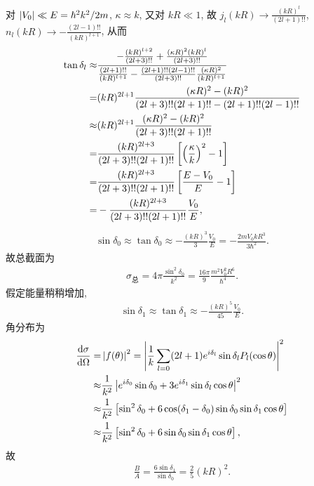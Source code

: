 \documentclass{assignment}
\begin{document}
\begin{sol}
    对 $\left\lvert V_0\right\rvert\ll E=\hbar^2k^2/2m$, $\kappa\approx k$, 又对 $kR\ll 1$, 故 $j_l(kR)\rightarrow\frac{(kR)^l}{(2l+1)!!}$, $n_l(kR)\rightarrow-\frac{(2l-1)!!}{(kR)^{l+1}}$, 从而
    \begin{align}
        \notag\tan\delta_l\approx&\frac{-\frac{(kR)^{l+2}}{(2l+3)!!}+\frac{(\kappa R)^2(kR)^l}{(2l+3)!!}}{\frac{(2l+1)!!}{(kR)^{l+1}}-\frac{(2l+1)!!(2l-1)!!}{(2l+3)!!}\frac{(\kappa R)^2}{(kR)^{l+1}}}\\
        \notag=&(kR)^{2l+1}\frac{(\kappa R)^2-(kR)^2}{(2l+3)!!(2l+1)!!-(2l+1)!!(2l-1)!!}\\
        \notag\approx&(kR)^{2l+1}\frac{(\kappa R)^2-(kR)^2}{(2l+3)!!(2l+1)!!}\\
        \notag=&\frac{(kR)^{2l+3}}{(2l+3)!!(2l+1)!!}\left[\left(\frac{\kappa}{k}\right)^2-1\right]\\
        \notag=&\frac{(kR)^{2l+3}}{(2l+3)!!(2l+1)!!}\left[\frac{E-V_0}{E}-1\right]\\
        =&-\frac{(kR)^{2l+3}}{(2l+3)!!(2l+1)!!}\frac{V_0}{E},
    \end{align}
    \begin{align}
        \sin\delta_0\approx\tan\delta_0\approx-\frac{(kR)^3}{3}\frac{V_0}{E}=-\frac{2mV_0kR^3}{3\hbar^2}.
    \end{align}
    故总截面为
    \begin{align}
        \sigma_{\text{总}}=4\pi\frac{\sin^2\delta_0}{k^2}=\frac{16\pi}{9}\frac{m^2V_0^2R^6}{\hbar^4}.
    \end{align}
    假定能量稍稍增加,
    \begin{align}
        \sin\delta_1\approx\tan\delta_1\approx-\frac{(kR)^5}{45}\frac{V_0}{E}.
    \end{align}
    角分布为
    \begin{align}
        \notag\frac{\mathrm{d}\sigma}{\mathrm{d}\Omega}=&\left\lvert f(\theta)\right\rvert^2=\left\lvert\frac{1}{k}\sum_{l=0}(2l+1)e^{i\delta_l}\sin\delta_lP_l(\cos\theta)\right\rvert^2\\
        \notag\approx&\frac{1}{k^2}\left\lvert e^{i\delta_0}\sin\delta_0+3e^{i\delta_1}\sin\delta_l\cos\theta\right\rvert^2\\
        \notag\approx&\frac{1}{k^2}\left[\sin^2\delta_0+6\cos(\delta_1-\delta_0)\sin\delta_0\sin\delta_1\cos\theta\right]\\
        \approx&\frac{1}{k^2}\left[\sin^2\delta_0+6\sin\delta_0\sin\delta_1\cos\theta\right],
    \end{align}
    故
    \begin{align}
        \frac{B}{A}=\frac{6\sin\delta_1}{\sin\delta_0}=\frac{2}{5}(kR)^2.
    \end{align}
\end{sol}
\end{document}
